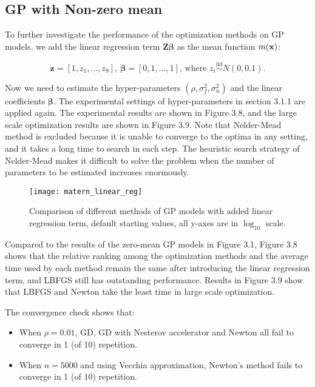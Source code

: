 \subsection{GP with Non-zero mean}

To further investigate the performance of the optimization methods on GP models, we add the linear regression term $\boldsymbol{Z\beta}$ as the mean function $m(\bold{x})$:

\begin{equation}
    \pmb{z} = [1, z_{1},...,z_{9}], \ \boldsymbol{\beta} = [0,1,...,1] \text{, where } z_{i}\overset{\mathrm{iid}}{\sim} N(0, 0.1).
\end{equation}

Now we need to estimate the hyper-parameters $(\rho, \sigma^2_f, \sigma^2_n)$ and the linear coefficients $\boldsymbol{\beta}$. The experimental settings of hyper-parameters in section 3.1.1 are applied again. The experimental results are shown in Figure 3.8, and the large scale optimization results are shown in Figure 3.9. Note that Nelder-Mead method is excluded because it is unable to converge to the optima in any setting, and it takes a long time to search in each step. The heuristic search strategy of Nelder-Mead makes it difficult to solve the problem when the number of parameters to be estimated increases enormously. 

\begin{figure}[hbt!]%
  \centering
  \texttt{[image: matern\_linear\_reg]} %
  \caption[Times of GP-Matern with linear regression terms: line graphs with range bars]%
  {Comparison of different methods of GP models with added linear regression term, default starting values, all y-axes are in $\log_{10}$ scale.}
  \label{fig:matern_linear}
\end{figure}

Compared to the results of the zero-mean GP models in Figure 3.1, Figure 3.8 shows that the relative ranking among the optimization methods and the average time used by each method remain the same after introducing the linear regression term, and LBFGS still has outstanding performance. Results in Figure 3.9 show that LBFGS and Newton take the least time in large scale optimization.

The convergence check shows that:
\begin{itemize}
    \item When $\rho=0.01$, GD, GD with Nesterov accelerator and Newton all fail to converge in 1 (of 10) repetition.
    \item When $n=5000$ and using Vecchia approximation, Newton's method fails to converge in 1 (of 10) repetition.
\end{itemize}

